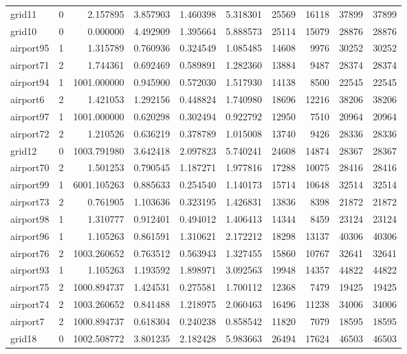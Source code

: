 \begin{longtable}{|l|r|r|r|r|r|r|r|r|r|}
grid11 & 0 & 2.157895 & 3.857903 & 1.460398 & 5.318301 & 25569 & 16118 & 37899 & 37899 \\
grid10 & 0 & 0.000000 & 4.492909 & 1.395664 & 5.888573 & 25114 & 15079 & 28876 & 28876 \\
airport95 & 1 & 1.315789 & 0.760936 & 0.324549 & 1.085485 & 14608 & 9976 & 30252 & 30252 \\
airport71 & 2 & 1.744361 & 0.692469 & 0.589891 & 1.282360 & 13884 & 9487 & 28374 & 28374 \\
airport94 & 1 & 1001.000000 & 0.945900 & 0.572030 & 1.517930 & 14138 & 8500 & 22545 & 22545 \\
airport6 & 2 & 1.421053 & 1.292156 & 0.448824 & 1.740980 & 18696 & 12216 & 38206 & 38206 \\
airport97 & 1 & 1001.000000 & 0.620298 & 0.302494 & 0.922792 & 12950 & 7510 & 20964 & 20964 \\
airport72 & 2 & 1.210526 & 0.636219 & 0.378789 & 1.015008 & 13740 & 9426 & 28336 & 28336 \\
grid12 & 0 & 1003.791980 & 3.642418 & 2.097823 & 5.740241 & 24608 & 14874 & 28367 & 28367 \\
airport70 & 2 & 1.501253 & 0.790545 & 1.187271 & 1.977816 & 17288 & 10075 & 28416 & 28416 \\
airport99 & 1 & 6001.105263 & 0.885633 & 0.254540 & 1.140173 & 15714 & 10648 & 32514 & 32514 \\
airport73 & 2 & 0.761905 & 1.103636 & 0.323195 & 1.426831 & 13836 & 8398 & 21872 & 21872 \\
airport98 & 1 & 1.310777 & 0.912401 & 0.494012 & 1.406413 & 14344 & 8459 & 23124 & 23124 \\
airport96 & 1 & 1.105263 & 0.861591 & 1.310621 & 2.172212 & 18298 & 13137 & 40306 & 40306 \\
airport76 & 2 & 1003.260652 & 0.763512 & 0.563943 & 1.327455 & 15860 & 10767 & 32641 & 32641 \\
airport93 & 1 & 1.105263 & 1.193592 & 1.898971 & 3.092563 & 19948 & 14357 & 44822 & 44822 \\
airport75 & 2 & 1000.894737 & 1.424531 & 0.275581 & 1.700112 & 12368 & 7479 & 19425 & 19425 \\
airport74 & 2 & 1003.260652 & 0.841488 & 1.218975 & 2.060463 & 16496 & 11238 & 34006 & 34006 \\
airport7 & 2 & 1000.894737 & 0.618304 & 0.240238 & 0.858542 & 11820 & 7079 & 18595 & 18595 \\
grid18 & 0 & 1002.508772 & 3.801235 & 2.182428 & 5.983663 & 26494 & 17624 & 46503 & 46503 \\

\end{longtable}
